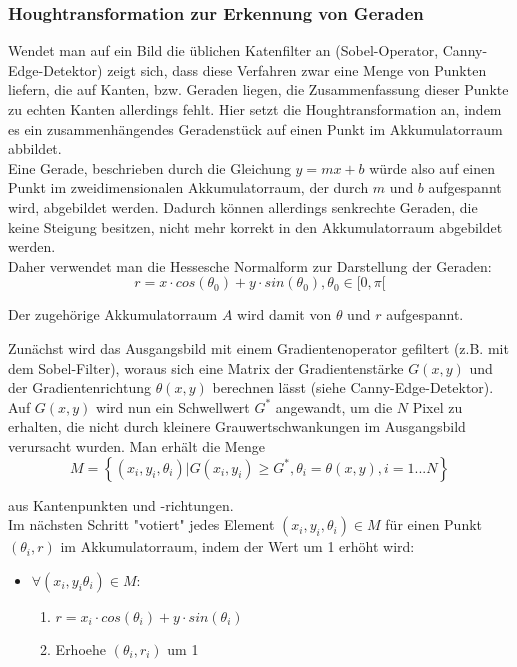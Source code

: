 		\subsubsection{Houghtransformation zur Erkennung von Geraden}
			Wendet man auf ein Bild die üblichen Katenfilter an (Sobel-Operator, Canny-Edge-Detektor) zeigt sich, dass diese Verfahren zwar eine Menge von Punkten liefern, die auf Kanten, bzw. Geraden liegen, die Zusammenfassung dieser Punkte zu echten Kanten allerdings fehlt. Hier setzt die Houghtransformation an, indem es ein zusammenhängendes Geradenstück auf einen Punkt im Akkumulatorraum abbildet. \\
Eine Gerade, beschrieben durch die Gleichung $y = mx + b$ würde also auf einen Punkt im zweidimensionalen Akkumulatorraum, der durch $m$ und $b$ aufgespannt wird, abgebildet werden. Dadurch können allerdings senkrechte Geraden, die keine Steigung besitzen, nicht mehr korrekt in den Akkumulatorraum abgebildet werden. \\
Daher verwendet man die Hessesche Normalform zur Darstellung der Geraden:
\begin{equation*}
r = x \cdot cos (\theta _0) + y \cdot sin (\theta _0) , \theta _0 \in [0, \pi [
\end{equation*}

Der zugehörige Akkumulatorraum $A$ wird damit von $\theta$ und $r$ aufgespannt.

Zunächst wird das Ausgangsbild mit einem Gradientenoperator gefiltert (z.B. mit dem Sobel-Filter), woraus sich eine Matrix der Gradientenstärke $G(x, y)$ und der Gradientenrichtung $\theta (x, y)$ berechnen lässt (siehe Canny-Edge-Detektor). \\
Auf $G(x, y)$ wird nun ein Schwellwert $G^*$ angewandt, um die $N$ Pixel zu erhalten, die nicht durch kleinere Grauwertschwankungen im Ausgangsbild verursacht wurden.  Man erhält die Menge
\begin{equation*}
M = \left \{ (x_i, y_i, \theta _i) | G(x_i, y_i) \geq G^*, \theta _i=\theta (x, y), i = 1...N \right \}
\end{equation*}

aus Kantenpunkten und -richtungen. \\
Im nächsten Schritt "votiert" jedes Element $(x_i, y_i, \theta_i) \in M$ für einen Punkt $(\theta_i, r)$ im Akkumulatorraum, indem der Wert um 1 erhöht wird:
\begin{itemize}
\item $\forall (x_i, y_i \theta_i) \in M:$
	\begin{enumerate}
		\item $r = x_i \cdot cos(\theta_i) + y \cdot sin(\theta_i)$
		\item {Erhoehe $(\theta_i, r_i)$ um 1}
	\end{enumerate}
\end{itemize}

